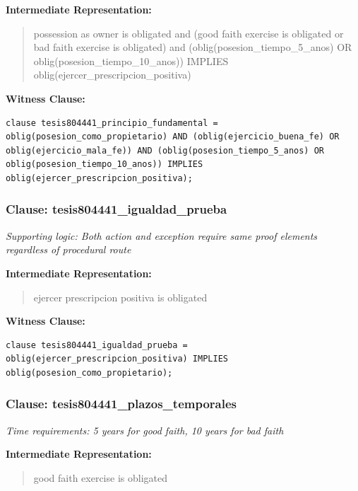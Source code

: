 \documentclass[11pt,a4paper]{article}
\begin{document}
\textbf{Intermediate Representation:}

\begin{quote}
possession as owner is obligated and (good faith exercise is obligated or bad faith exercise is obligated) and (oblig(posesion\_tiempo\_5\_anos) OR oblig(posesion\_tiempo\_10\_anos)) IMPLIES oblig(ejercer\_prescripcion\_positiva)
\end{quote}

\textbf{Witness Clause:}

\begin{lstlisting}[style=witnessstyle, language=Witness]
clause tesis804441_principio_fundamental = oblig(posesion_como_propietario) AND (oblig(ejercicio_buena_fe) OR oblig(ejercicio_mala_fe)) AND (oblig(posesion_tiempo_5_anos) OR oblig(posesion_tiempo_10_anos)) IMPLIES oblig(ejercer_prescripcion_positiva);
\end{lstlisting}

\subsubsection{Clause: tesis804441\_igualdad\_prueba}

\textit{Supporting logic: Both action and exception require same proof elements regardless of procedural route}

\textbf{Intermediate Representation:}

\begin{quote}
ejercer prescripcion positiva is obligated
\end{quote}

\textbf{Witness Clause:}

\begin{lstlisting}[style=witnessstyle, language=Witness]
clause tesis804441_igualdad_prueba = oblig(ejercer_prescripcion_positiva) IMPLIES oblig(posesion_como_propietario);
\end{lstlisting}

\subsubsection{Clause: tesis804441\_plazos\_temporales}

\textit{Time requirements: 5 years for good faith, 10 years for bad faith}

\textbf{Intermediate Representation:}

\begin{quote}
good faith exercise is obligated
\end{quote}
\end{document}
